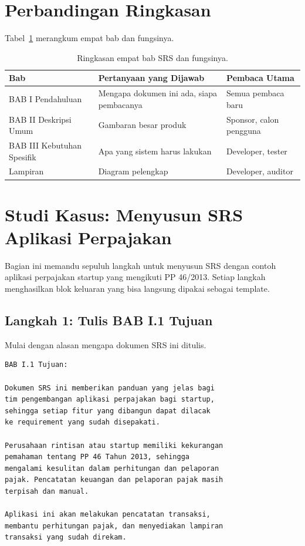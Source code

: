 \documentclass[11pt,a4paper]{article}
\begin{document}
\section{Perbandingan Ringkasan}

Tabel~\ref{tab:summary} merangkum empat bab dan fungsinya.

\begin{table}[H]
	\centering
	\caption{Ringkasan empat bab SRS dan fungsinya.}
	\label{tab:summary}
	\footnotesize
	\begin{tabularx}{\textwidth}{l X X}
		\toprule
		Bab                        & Pertanyaan yang Dijawab                   & Pembaca Utama           \\
		\midrule
		BAB I Pendahuluan          & Mengapa dokumen ini ada, siapa pembacanya & Semua pembaca baru      \\
		BAB II Deskripsi Umum      & Gambaran besar produk                     & Sponsor, calon pengguna \\
		BAB III Kebutuhan Spesifik & Apa yang sistem harus lakukan             & Developer, tester       \\
		Lampiran                   & Diagram pelengkap                         & Developer, auditor      \\
		\bottomrule
	\end{tabularx}
\end{table}

\section{Studi Kasus: Menyusun SRS Aplikasi Perpajakan}

Bagian ini memandu sepuluh langkah untuk menyusun SRS dengan contoh aplikasi perpajakan startup yang mengikuti PP 46/2013. Setiap langkah menghasilkan blok keluaran yang bisa langsung dipakai sebagai template.

\subsection{Langkah 1: Tulis BAB I.1 Tujuan}

Mulai dengan alasan mengapa dokumen SRS ini ditulis.

\begin{lstlisting}[style=out]
BAB I.1 Tujuan:

Dokumen SRS ini memberikan panduan yang jelas bagi
tim pengembangan aplikasi perpajakan bagi startup,
sehingga setiap fitur yang dibangun dapat dilacak
ke requirement yang sudah disepakati.

Perusahaan rintisan atau startup memiliki kekurangan
pemahaman tentang PP 46 Tahun 2013, sehingga
mengalami kesulitan dalam perhitungan dan pelaporan
pajak. Pencatatan keuangan dan pelaporan pajak masih
terpisah dan manual.

Aplikasi ini akan melakukan pencatatan transaksi,
membantu perhitungan pajak, dan menyediakan lampiran
transaksi yang sudah direkam.
\end{lstlisting}
\end{document}
